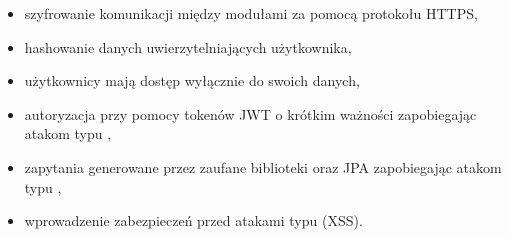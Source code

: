 \begin{itemize}
    \item szyfrowanie komunikacji między modułami za pomocą protokołu HTTPS,
    \item hashowanie danych uwierzytelniających użytkownika,
    \item użytkownicy mają dostęp wyłącznie do swoich danych,
    \item autoryzacja przy pomocy tokenów JWT o krótkim ważności zapobiegając atakom typu ,
    \item zapytania generowane przez zaufane biblioteki oraz JPA zapobiegając atakom typu ,
    \item wprowadzenie zabezpieczeń przed atakami typu  (XSS).
\end{itemize}